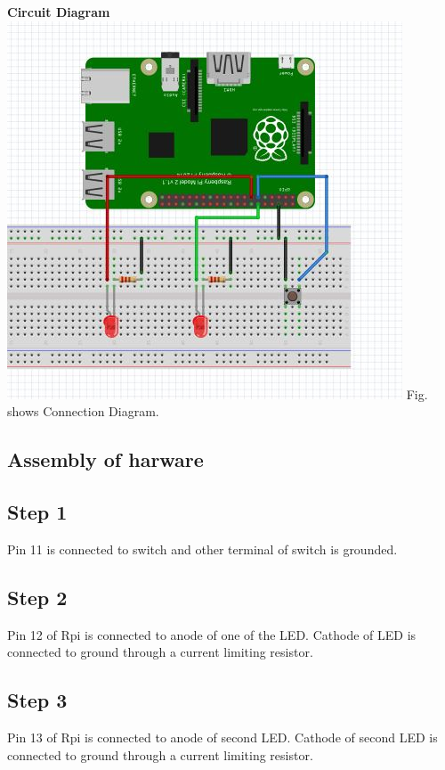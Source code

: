 \documentclass[a4paper,12pt,oneside]{book}
\begin{document}
\textbf{Circuit Diagram}  \\
\centering
\includegraphics[scale = 0.6]{switch_interrupt}
\flushleft
Fig. shows Connection Diagram.
\subsection*{Assembly of harware}
\subsection*{Step 1}
Pin 11 is connected to switch and other terminal of switch is grounded.
\subsection*{Step 2}
Pin 12 of Rpi is connected to anode of one of the LED. Cathode of LED is connected to ground through a current limiting resistor.
\subsection*{Step 3}
Pin 13 of Rpi is connected to anode of second LED. Cathode of second LED is connected to ground through a current limiting resistor.
\end{document}
